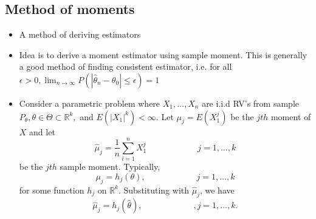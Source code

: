 \documentclass[12pt]{report} \addtolength{\textheight}{2in}
\newcommand{\Realnum}{\mathbb{R}}
\begin{document}
\subsection*{Method of moments}
\begin{itemize}
\item A method of deriving estimators
\item Idea is to derive a moment estimator using sample moment. This is generally a good method of finding consistent estimator, i.e. for all $\epsilon > 0, \lim_{n\to \infty} P(|\hat{\theta}_n-\theta_{0}| \leq \epsilon) =1$
\item Consider a parametric problem where $X_1,\dots,X_n$ are i.i.d RV's from sample $P_\theta, \theta \in \Theta \subset \Realnum^{k},$ and $E(|X_1|^k) < \infty.$ Let $\mu_{j}=E(X_1^{j})$ be the $jth$ moment of $X$ and let 
\begin{displaymath}
\boxed
{
\hat{\mu}_j=\frac{1}{n} \sum_{i=1}^{n}X_1^{j}} \hspace{1in} j=1,\dots,k
\end{displaymath} 
be the $jth$ sample moment. Typically,
\begin{displaymath}
\mu_{j}=h_{j}(\theta), \hspace{1in} j=1,\dots,k
\end{displaymath}
for some function $h_j $ on $\Realnum^k$. Substituting with $\hat{\mu}_j$, we have
\begin{displaymath}
\hat{\mu}_{j}=h_{j}(\hat{\theta}), \hspace{1in}, j=1,\dots,k.
\end{displaymath}

\end{itemize}
\newpage
\end{document}
